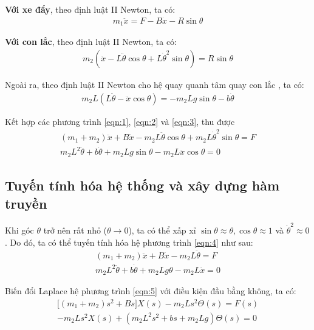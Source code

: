 \documentclass[12pt,a4paper]{article}
\begin{document}
\textbf{Với xe đẩy}, theo định luật II Newton, ta có:
\begin{align}
    m_1\ddot x = F- B\dot x - R\sin\theta \label{eqn:1}
\end{align}

\textbf{Với con lắc}, theo định luật II Newton, ta có:
\begin{align}
    m_2(\ddot x - L\ddot\theta\cos\theta +  L\dot\theta^2\sin\theta ) = R\sin\theta \label{eqn:2}
\end{align}

Ngoài ra, theo định luật II Newton cho hệ quay quanh tâm quay con lắc , ta có:
\begin{align}
    m_2L (L \ddot\theta -\ddot x\cos\theta) =- m_2Lg\sin\theta -b\dot\theta\label{eqn:3}
\end{align}

Kết hợp các phương trình \eqref{eqn:1}, \eqref{eqn:2} và \eqref{eqn:3}, thu được
\begin{equation}
    \begin{aligned}
        (m_1 + m_2)\ddot x + B\dot x - m_2L\ddot\theta\cos\theta + m_2L\dot\theta^2 \sin\theta = F\\
     m_2L^2 \ddot\theta + b\dot\theta + m_2Lg\sin\theta - m_2L\ddot x \cos\theta = 0
    \end{aligned}\label{eqn:4}
\end{equation}

\subsection{Tuyến tính hóa hệ thống và xây dựng hàm truyền}

Khi góc $\theta$ trở nên rất nhỏ ($\theta\to 0$), ta có thể xấp xỉ $\sin \theta \approx \theta,\cos\theta \approx 1$ và $\dot\theta^2 \approx 0$. Do đó, ta có thể tuyến tính hóa hệ phương trình \eqref{eqn:4} như sau:
\begin{equation}
    \begin{aligned}
        (m_1 + m_2)\ddot x + B\dot x - m_2L\ddot\theta  = F\\
     m_2L^2 \ddot\theta + b\dot\theta + m_2Lg\theta - m_2L\ddot x  = 0
    \end{aligned}\label{eqn:5}
\end{equation}

Biến đổi Laplace hệ phương trình \eqref{eqn:5} với điều kiện đầu bằng không, ta có:
\begin{equation}
    \begin{aligned}
        \lbrack(m_1+m_2)s^2 + Bs\rbrack X(s) - m_2 Ls^2 \Theta(s) = F(s)\\
        -m_2 L s^2 X(s) + (m_2L^2s^2 + bs + m_2Lg)\Theta(s) = 0
    \end{aligned}\label{eqn:6}
\end{equation}
\end{document}
